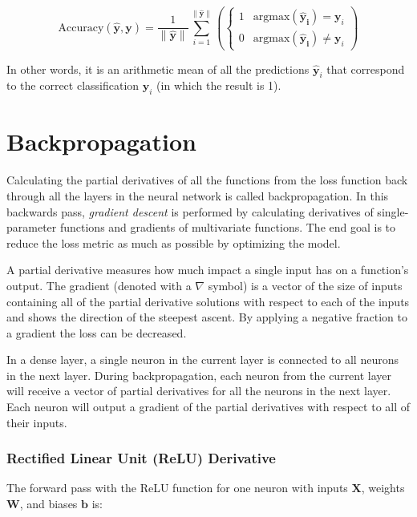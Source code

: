\documentclass[a4paper]{article}
\newcommand{\matr}[1]{\mathbf{#1}}
\newcommand{\vect}[1]{\bm{#1}}
\newcommand{\argmax}{\text{argmax}}
\begin{document}
\begin{equation*}
    \text{Accuracy}(\vect{\hat{y}},\vect{y}) = \frac{1}{\|\vect{\hat{y}}\|} \sum_{i=1}^{\|\vect{\hat{y}}\|} \left( \begin{cases}
                1 & \argmax(\vect{\hat{y}_i}) = \vect{y}_i \\
                0 & \argmax(\vect{\hat{y}_i}) \not= \vect{y}_i
            \end{cases}
            \right)
\end{equation*}

In other words, it is an arithmetic mean of all the predictions $\vect{\hat{y}}_i$ that correspond to the correct classification $\vect{y}_i$ (in which the result is 1).

\pagebreak
\section*{Backpropagation}
Calculating the partial derivatives of all the functions from the loss function back through all the
layers in the neural network is called backpropagation. In this backwards pass, \emph{gradient descent} is performed by calculating derivatives of single-parameter functions and gradients of multivariate functions. The end goal is to reduce the loss metric as much as possible by optimizing the model.

A partial derivative measures how much impact a single input has on a function's output. The gradient (denoted with a $\nabla$ symbol) is a vector of the size of inputs containing all of the partial derivative solutions with respect to each of the inputs and shows the direction of the steepest ascent. By applying a negative fraction to a gradient the loss can be decreased.

In a dense layer, a single neuron in the current layer is connected to all neurons in the next 
layer. During backpropagation, each neuron from the current layer will receive a vector of partial 
derivatives for all the neurons in the next layer. Each neuron will output a gradient of the partial derivatives with respect to all of their inputs.

\subsubsection*{Rectified Linear Unit (ReLU) Derivative}

The forward pass with the ReLU function for one neuron with inputs $\matr{X}$, weights $\matr{W}$, and biases $\vect{b}$ is:
\end{document}
